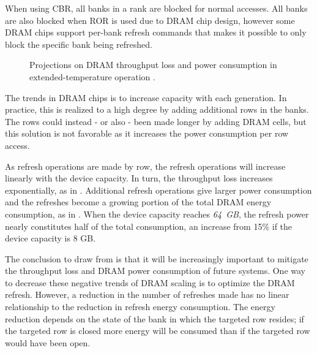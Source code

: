 When using CBR, all banks in a rank are blocked for normal accesses. All banks are also blocked when ROR is used due to DRAM chip design, however some DRAM chips support per-bank refresh commands that makes it possible to only block the specific bank being refreshed. 

\begin{figure}[t]
    \centering
    \caption{Projections on DRAM throughput loss and power consumption in extended-temperature operation \cite{raidr}.}
    \label{fig:dram_data_proj}
\end{figure}

The trends in DRAM chips is to increase capacity with each generation. In practice, this is realized to a high degree by adding additional rows in the banks. The rows could instead - or also - been made longer by adding DRAM cells, but this solution is not favorable as it increases the power consumption per row access. 

As refresh operations are made by row, the refresh operations will increase linearly with the device capacity. In turn, the throughput loss increases exponentially, as in . Additional refresh operations give larger power consumption and the refreshes become a growing portion of the total DRAM energy consumption, as in . When the device capacity reaches \textit{64~GB}, the refresh power nearly constitutes half of the total consumption, an increase from 15\% if the device capacity is 8 GB. 

The conclusion to draw from  is that it will be increasingly important to mitigate the throughput loss and DRAM power consumption of future systems. One way to decrease these negative trends of DRAM scaling is to optimize the DRAM refresh. However, a reduction in the number of refreshes made has no linear relationship to the reduction in refresh energy consumption. The energy reduction depends on the state of the bank in which the targeted row resides; if the targeted row is closed more energy will be consumed than if the targeted row would have been open.